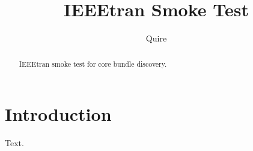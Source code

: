 \documentclass[conference]{IEEEtran}
\begin{document}
\title{IEEEtran Smoke Test}
\author{Quire}
\maketitle
\begin{abstract}
IEEEtran smoke test for core bundle discovery.
\end{abstract}
\section{Introduction}
Text.
\end{document}
